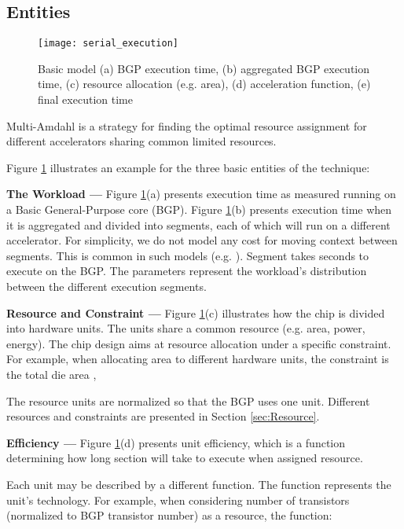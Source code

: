 \documentclass[twocolumn,english]{IEEEtran}
\begin{document}
\subsection{Entities}

\begin{figure}[t]
\texttt{[image: serial\_execution]}

\caption{\label{fig:basic-model}Basic model (a) BGP execution time, (b) aggregated
BGP execution time, (c) resource allocation (e.g. area), (d) acceleration
function, (e) final execution time}
\end{figure}


Multi-Amdahl is a strategy for finding the optimal resource assignment
for different accelerators sharing common limited resources. 

Figure \ref{fig:basic-model} illustrates an example for the three
basic entities of the technique: 

\textbf{The Workload ---} Figure \ref{fig:basic-model}(a) presents
execution time as measured running on a Basic General-Purpose core
(BGP). Figure \ref{fig:basic-model}(b) presents execution time when
it is aggregated and divided into  segments, each of which will
run on a different accelerator. For simplicity, we do not model any
cost for moving context between segments. This is common in such models
(e.g. \cite{hill2008amdahl,ExtendingAmda,Shee08}). Segment  takes
 seconds to execute on the BGP. The parameters 
represent the workload's distribution between the different execution
segments.




\textbf{Resource and Constraint ---} Figure \ref{fig:basic-model}(c)
illustrates how the chip is divided into  hardware units. The
units share a common resource (e.g. area, power, energy). The chip
design aims at resource allocation under a specific constraint. For
example, when allocating area  to different hardware units, the
constraint is the total die area ,


The resource units are normalized so that the BGP uses one unit. Different
resources and constraints are presented in Section \ref{sec:Resource}.

\textbf{Efficiency ---} Figure \ref{fig:basic-model}(d) presents
unit efficiency, which is a function determining how long section
 will take to execute when assigned  resource.




Each unit may be described by a different function. The function represents
the unit's technology. For example, when considering number of transistors
(normalized to BGP transistor number) as a resource, the function:
\end{document}
